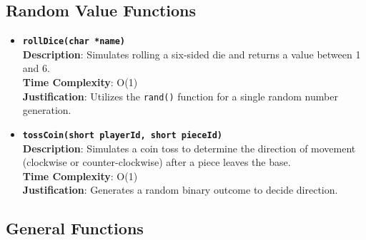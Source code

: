 \documentclass{article}
\begin{document}
        \subsection{Random Value Functions}
        
        \begin{itemize}
            \item \textbf{\texttt{rollDice(char *name)}}\\
            \textbf{Description}: Simulates rolling a six-sided die and returns a value between 1 and 6.\\
            \textbf{Time Complexity}: O(1)\\
            \textbf{Justification}: Utilizes the \texttt{rand()} function for a single random number generation.
            
            \item \textbf{\texttt{tossCoin(short playerId, short pieceId)}}\\
            \textbf{Description}: Simulates a coin toss to determine the direction of movement (clockwise or counter-clockwise) after a piece leaves the base.\\
            \textbf{Time Complexity}: O(1)\\
            \textbf{Justification}: Generates a random binary outcome to decide direction.
        \end{itemize}
        
        \subsection{General Functions}
        
\end{document}
